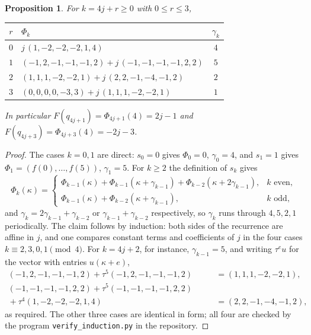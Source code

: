\documentclass[12pt]{article}
\theoremstyle{plain}
\newtheorem{proposition}[theorem]{Proposition}
\theoremstyle{remark}
\begin{document}
\begin{proposition}\label{prop:blocks}
For $k=4j+r\ge0$ with $0\le r\le3$,
\begin{center}
\begin{tabular}{clc}
\toprule
$r$ & $\Phi_k$ & $\gamma_k$\\
\midrule
$0$ & $j\,(1,-2,-2,-2,1,4)$ & $4$\\
$1$ & $(-1,2,-1,-1,-1,2)+j\,(-1,-1,-1,-1,2,2)$ & $5$\\
$2$ & $(1,1,1,-2,-2,1)+j\,(2,2,-1,-4,-1,2)$ & $2$\\
$3$ & $(0,0,0,0,-3,3)+j\,(1,1,1,-2,-2,1)$ & $1$\\
\bottomrule
\end{tabular}
\end{center}
In particular $F(q_{4j+1})=\Phi_{4j+1}(4)=2j-1$ and $F(q_{4j+3})=\Phi_{4j+3}(4)=-2j-3$.
\end{proposition}

\begin{proof}
The cases $k=0,1$ are direct: $s_0=0$ gives $\Phi_0=0$, $\gamma_0=4$, and $s_1=1$ gives
$\Phi_1=(f(0),\dots,f(5))$, $\gamma_1=5$. For $k\ge2$ the definition of $s_k$ gives
\[
\Phi_k(\kappa)=\begin{cases}
\Phi_{k-1}(\kappa)+\Phi_{k-1}(\kappa+\gamma_{k-1})+\Phi_{k-2}(\kappa+2\gamma_{k-1}),&k\text{ even},\\
\Phi_{k-1}(\kappa)+\Phi_{k-2}(\kappa+\gamma_{k-1}),&k\text{ odd},
\end{cases}
\]
and $\gamma_k=2\gamma_{k-1}+\gamma_{k-2}$ or $\gamma_{k-1}+\gamma_{k-2}$ respectively, so
$\gamma_k$ runs through $4,5,2,1$ periodically. The claim follows by induction: both sides of
the recurrence are affine in $j$, and one compares constant terms and coefficients of $j$ in the
four cases $k\equiv2,3,0,1\pmod 4$. For $k=4j+2$, for instance, $\gamma_{k-1}=5$, and writing
$\tau^e u$ for the vector with entries $u(\kappa+e)$,
\begin{align*}
(-1,2,-1,-1,-1,2)+\tau^5(-1,2,-1,-1,-1,2)&=(1,1,1,-2,-2,1),\\
(-1,-1,-1,-1,2,2)+\tau^5(-1,-1,-1,-1,2,2)\qquad&\\
{}+\tau^{4}(1,-2,-2,-2,1,4)&=(2,2,-1,-4,-1,2),
\end{align*}
as required. The other three cases are identical in form; all four are checked by the program
\texttt{verify\_induction.py} in the repository.
\end{proof}
\end{document}
